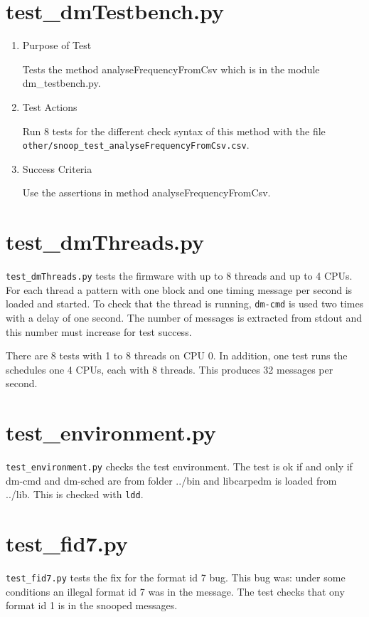 \documentclass[12pt,a4paper]{report}
\begin{document}
\section{test\_dmTestbench.py}
\begin{enumerate}
  \item Purpose of Test

  Tests the method analyseFrequencyFromCsv which is in
  the module dm\_testbench.py.
  \item Test Actions

  Run 8 tests for the different check syntax of this method with the
  file \texttt{other/snoop\_test\_analyseFrequencyFromCsv.csv}.
  \item Success Criteria

  Use the assertions in method analyseFrequencyFromCsv.
\end{enumerate}

\section{test\_dmThreads.py}
\texttt{test\_dmThreads.py} tests the firmware with up to 8 threads and up to 4 CPUs.
For each thread a pattern with one block and one timing message per second is
loaded and started. To check that the thread is running,
\texttt{dm-cmd} is used two times with a delay of one second. The number
of messages is extracted from stdout and this number must increase for test success.

There are 8 tests with 1 to 8 threads on CPU 0. In addition, one test runs
the schedules one 4 CPUs, each with 8 threads. This produces 32 messages per second.

\section{test\_environment.py}
\texttt{test\_environment.py} checks the test environment. The test is ok if and only if dm-cmd and dm-sched are
from folder ../bin and libcarpedm is loaded from ../lib. This is checked with \texttt{ldd}.

\section{test\_fid7.py}
\texttt{test\_fid7.py} tests the fix for the format id 7 bug. This bug
was: under some conditions an illegal format id 7 was in the message.
The test checks that ony format id 1 is in the snooped messages.
\end{document}
